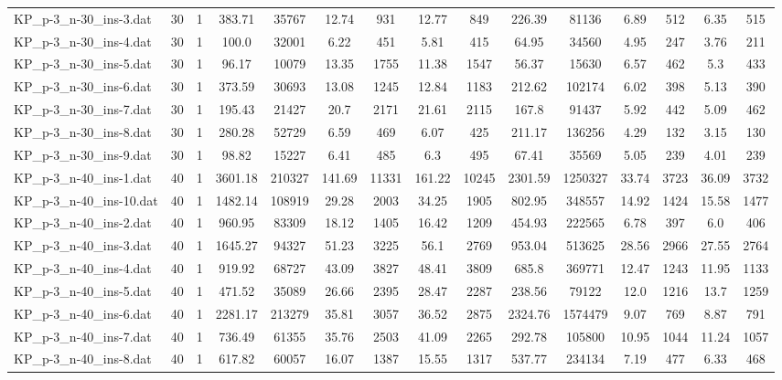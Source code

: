 \begin{table}[!ht]
{\begin{tabular}{lcccccccccccccc}
KP\_p-3\_n-30\_ins-3.dat & 30 & 1 & 383.71 & 35767 & 12.74 & 931 & 12.77 & 849 & 226.39 & 81136 & 6.89 & 512 & 6.35 & 515 \\
KP\_p-3\_n-30\_ins-4.dat & 30 & 1 & 100.0 & 32001 & 6.22 & 451 & 5.81 & 415 & 64.95 & 34560 & 4.95 & 247 & 3.76 & 211 \\
KP\_p-3\_n-30\_ins-5.dat & 30 & 1 & 96.17 & 10079 & 13.35 & 1755 & 11.38 & 1547 & 56.37 & 15630 & 6.57 & 462 & 5.3 & 433 \\
KP\_p-3\_n-30\_ins-6.dat & 30 & 1 & 373.59 & 30693 & 13.08 & 1245 & 12.84 & 1183 & 212.62 & 102174 & 6.02 & 398 & 5.13 & 390 \\
KP\_p-3\_n-30\_ins-7.dat & 30 & 1 & 195.43 & 21427 & 20.7 & 2171 & 21.61 & 2115 & 167.8 & 91437 & 5.92 & 442 & 5.09 & 462 \\
KP\_p-3\_n-30\_ins-8.dat & 30 & 1 & 280.28 & 52729 & 6.59 & 469 & 6.07 & 425 & 211.17 & 136256 & 4.29 & 132 & 3.15 & 130 \\
KP\_p-3\_n-30\_ins-9.dat & 30 & 1 & 98.82 & 15227 & 6.41 & 485 & 6.3 & 495 & 67.41 & 35569 & 5.05 & 239 & 4.01 & 239 \\
KP\_p-3\_n-40\_ins-1.dat & 40 & 1 & 3601.18 & 210327 & 141.69 & 11331 & 161.22 & 10245 & 2301.59 & 1250327 & 33.74 & 3723 & 36.09 & 3732 \\
KP\_p-3\_n-40\_ins-10.dat & 40 & 1 & 1482.14 & 108919 & 29.28 & 2003 & 34.25 & 1905 & 802.95 & 348557 & 14.92 & 1424 & 15.58 & 1477 \\
KP\_p-3\_n-40\_ins-2.dat & 40 & 1 & 960.95 & 83309 & 18.12 & 1405 & 16.42 & 1209 & 454.93 & 222565 & 6.78 & 397 & 6.0 & 406 \\
KP\_p-3\_n-40\_ins-3.dat & 40 & 1 & 1645.27 & 94327 & 51.23 & 3225 & 56.1 & 2769 & 953.04 & 513625 & 28.56 & 2966 & 27.55 & 2764 \\
KP\_p-3\_n-40\_ins-4.dat & 40 & 1 & 919.92 & 68727 & 43.09 & 3827 & 48.41 & 3809 & 685.8 & 369771 & 12.47 & 1243 & 11.95 & 1133 \\
KP\_p-3\_n-40\_ins-5.dat & 40 & 1 & 471.52 & 35089 & 26.66 & 2395 & 28.47 & 2287 & 238.56 & 79122 & 12.0 & 1216 & 13.7 & 1259 \\
KP\_p-3\_n-40\_ins-6.dat & 40 & 1 & 2281.17 & 213279 & 35.81 & 3057 & 36.52 & 2875 & 2324.76 & 1574479 & 9.07 & 769 & 8.87 & 791 \\
KP\_p-3\_n-40\_ins-7.dat & 40 & 1 & 736.49 & 61355 & 35.76 & 2503 & 41.09 & 2265 & 292.78 & 105800 & 10.95 & 1044 & 11.24 & 1057 \\
KP\_p-3\_n-40\_ins-8.dat & 40 & 1 & 617.82 & 60057 & 16.07 & 1387 & 15.55 & 1317 & 537.77 & 234134 & 7.19 & 477 & 6.33 & 468 \\

\end{tabular}}
\end{table}
